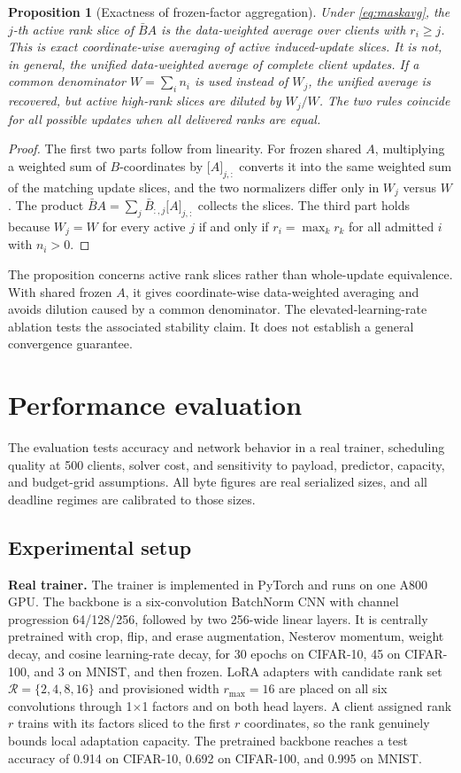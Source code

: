 \documentclass[preprint,12pt]{elsarticle}
\newtheorem{proposition}{Proposition}
\begin{document}
\begin{proposition}[Exactness of frozen-factor aggregation]
\label{prop:agg}
Under \eqref{eq:maskavg}, the $j$-th active rank slice of $\bar BA$ is the data-weighted average over clients with $r_i\ge j$. This is exact coordinate-wise averaging of active induced-update slices. It is not, in general, the unified data-weighted average of complete client updates. If a common denominator $W=\sum_i n_i$ is used instead of $W_j$, the unified average is recovered, but active high-rank slices are diluted by $W_j/W$. The two rules coincide for all possible updates when all delivered ranks are equal.
\end{proposition}
\begin{proof}
The first two parts follow from linearity. For frozen shared $A$, multiplying a weighted sum of $B$-coordinates by $\big[A\big]_{j,:}$ converts it into the same weighted sum of the matching update slices, and the two normalizers differ only in $W_j$ versus $W$. The product $\bar BA=\sum_j\bar B_{:,j}\big[A\big]_{j,:}$ collects the slices. The third part holds because $W_j=W$ for every active $j$ if and only if $r_i=\max_k r_k$ for all admitted $i$ with $n_i>0$.
\end{proof}

The proposition concerns active rank slices rather than whole-update equivalence. With shared frozen $A$, it gives coordinate-wise data-weighted averaging and avoids dilution caused by a common denominator. The elevated-learning-rate ablation tests the associated stability claim. It does not establish a general convergence guarantee.

\section{Performance evaluation}
\label{sec:eval}

The evaluation tests accuracy and network behavior in a real trainer, scheduling quality at 500 clients, solver cost, and sensitivity to payload, predictor, capacity, and budget-grid assumptions. All byte figures are real serialized sizes, and all deadline regimes are calibrated to those sizes.

\subsection{Experimental setup}
\textbf{Real trainer.} The trainer is implemented in PyTorch and runs on one A800 GPU. The backbone is a six-convolution BatchNorm CNN with channel progression 64/128/256, followed by two 256-wide linear layers. It is centrally pretrained with crop, flip, and erase augmentation, Nesterov momentum, weight decay, and cosine learning-rate decay, for 30 epochs on CIFAR-10, 45 on CIFAR-100, and 3 on MNIST, and then frozen. LoRA adapters with candidate rank set $\mathcal R=\{2,4,8,16\}$ and provisioned width $r_{\max}=16$ are placed on all six convolutions through 1$\times$1 factors and on both head layers. A client assigned rank $r$ trains with its factors sliced to the first $r$ coordinates, so the rank genuinely bounds local adaptation capacity. The pretrained backbone reaches a test accuracy of 0.914 on CIFAR-10, 0.692 on CIFAR-100, and 0.995 on MNIST.
\end{document}
